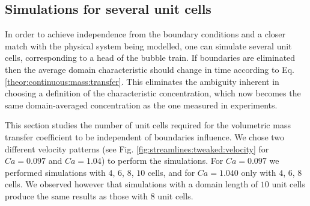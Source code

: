 \documentclass{article}
\begin{document}

\subsection{Simulations for several unit cells}
In order to achieve independence from the boundary conditions and a closer match with
the physical system being modelled, one can simulate several unit cells, corresponding
to a head of the bubble train.  If boundaries are eliminated then the average
domain characteristic should change in time according to Eq.
\ref{theor:continuous:mass:transfer}. This eliminates the ambiguity inherent in choosing a definition
of the characteristic concentration, which now becomes the same domain-averaged concentration
as the one measured in experiments.

This section studies the number of unit cells required for the volumetric
mass transfer coefficient to be independent of boundaries influence. We chose two
different
velocity patterns (see Fig. \ref{fig:streamlines:tweaked:velocity} for $Ca=0.097$ and $Ca=1.04$) to
perform the simulations. For $Ca=0.097$ we performed simulations with
$4$, $6$, $8$, $10$ cells, and for $Ca=1.040$ only with $4$, $6$, $8$ cells.
We observed however that simulations with a domain length of $10$ unit cells produce the same results as those with $8$ unit cells.
\end{document}
